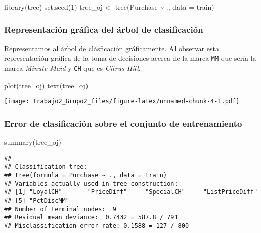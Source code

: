 \documentclass[
]{article}
\newenvironment{Shaded}{\begin{snugshade}}{\end{snugshade}}
\newcommand{\AttributeTok}[1]{\textcolor[rgb]{0.77,0.63,0.00}{#1}}
\newcommand{\DecValTok}[1]{\textcolor[rgb]{0.00,0.00,0.81}{#1}}
\newcommand{\FunctionTok}[1]{\textcolor[rgb]{0.00,0.00,0.00}{#1}}
\newcommand{\NormalTok}[1]{#1}
\newcommand{\OtherTok}[1]{\textcolor[rgb]{0.56,0.35,0.01}{#1}}
\newcommand{\SpecialCharTok}[1]{\textcolor[rgb]{0.00,0.00,0.00}{#1}}
\begin{document}
\begin{Shaded}
\begin{Highlighting}[]
\FunctionTok{library}\NormalTok{(tree)}
\FunctionTok{set.seed}\NormalTok{(}\DecValTok{1}\NormalTok{)}
\NormalTok{tree\_oj }\OtherTok{\textless{}{-}} \FunctionTok{tree}\NormalTok{(Purchase }\SpecialCharTok{\textasciitilde{}}\NormalTok{ ., }\AttributeTok{data =}\NormalTok{ train)}
\end{Highlighting}
\end{Shaded}

\hypertarget{representaciuxf3n-gruxe1fica-del-uxe1rbol-de-clasificaciuxf3n}{%
\subsubsection{Representación gráfica del árbol de
clasificación}\label{representaciuxf3n-gruxe1fica-del-uxe1rbol-de-clasificaciuxf3n}}

Representamos al árbol de clásficación gráficamente. Al observar esta
representación gráfica de la toma de decisiones acerca de la marca
\texttt{MM} que sería la marca \emph{Minute Maid} y \texttt{CH} que es
\emph{Citrus Hill}.

\begin{Shaded}
\begin{Highlighting}[]
\FunctionTok{plot}\NormalTok{(tree\_oj)}
\FunctionTok{text}\NormalTok{(tree\_oj)}
\end{Highlighting}
\end{Shaded}

\texttt{[image: Trabajo2\_Grupo2\_files/figure-latex/unnamed-chunk-4-1.pdf]}

\hypertarget{error-de-clasificaciuxf3n-sobre-el-conjunto-de-entrenamiento}{%
\subsubsection{Error de clasificación sobre el conjunto de
entrenamiento}\label{error-de-clasificaciuxf3n-sobre-el-conjunto-de-entrenamiento}}

\begin{Shaded}
\begin{Highlighting}[]
\FunctionTok{summary}\NormalTok{(tree\_oj)}
\end{Highlighting}
\end{Shaded}

\begin{verbatim}
## 
## Classification tree:
## tree(formula = Purchase ~ ., data = train)
## Variables actually used in tree construction:
## [1] "LoyalCH"       "PriceDiff"     "SpecialCH"     "ListPriceDiff"
## [5] "PctDiscMM"    
## Number of terminal nodes:  9 
## Residual mean deviance:  0.7432 = 587.8 / 791 
## Misclassification error rate: 0.1588 = 127 / 800
\end{verbatim}
\end{document}
